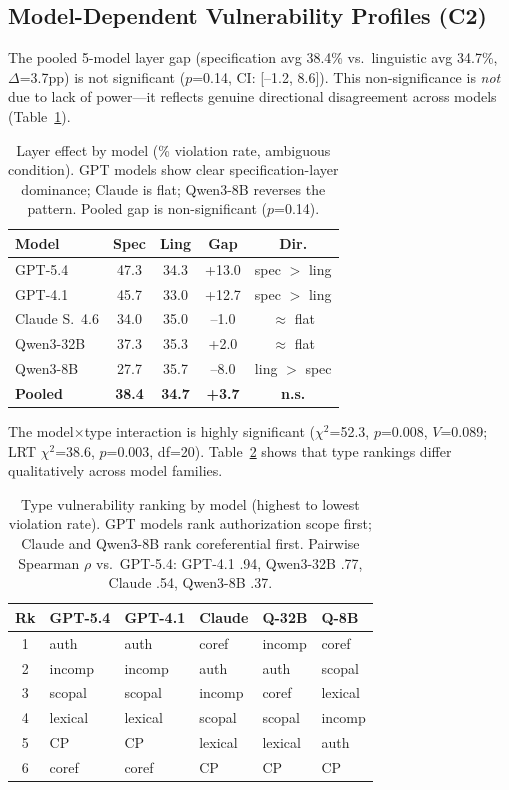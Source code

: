 \documentclass[11pt]{article}
\begin{document}
\subsection{Model-Dependent Vulnerability Profiles (C2)}

The pooled 5-model layer gap (specification avg 38.4\% vs.\ linguistic avg 34.7\%, $\Delta$=3.7pp) is not significant ($p$=0.14, CI: [--1.2, 8.6]). This non-significance is \emph{not} due to lack of power---it reflects genuine directional disagreement across models (Table~\ref{tab:layer}).

\begin{table}[t]
\centering
\small
\begin{tabular}{lcccc}
\toprule
\textbf{Model} & \textbf{Spec} & \textbf{Ling} & \textbf{Gap} & \textbf{Dir.} \\
\midrule
GPT-5.4 & 47.3 & 34.3 & +13.0 & spec $>$ ling \\
GPT-4.1 & 45.7 & 33.0 & +12.7 & spec $>$ ling \\
Claude S.\ 4.6 & 34.0 & 35.0 & --1.0 & $\approx$ flat \\
Qwen3-32B & 37.3 & 35.3 & +2.0 & $\approx$ flat \\
Qwen3-8B & 27.7 & 35.7 & --8.0 & ling $>$ spec \\
\midrule
\textbf{Pooled} & \textbf{38.4} & \textbf{34.7} & \textbf{+3.7} & \textbf{n.s.} \\
\bottomrule
\end{tabular}
\caption{Layer effect by model (\% violation rate, ambiguous condition). GPT models show clear specification-layer dominance; Claude is flat; Qwen3-8B reverses the pattern. Pooled gap is non-significant ($p$=0.14).}
\label{tab:layer}
\end{table}

The model$\times$type interaction is highly significant ($\chi^2$=52.3, $p$=0.008, $V$=0.089; LRT $\chi^2$=38.6, $p$=0.003, df=20). Table~\ref{tab:rank} shows that type rankings differ qualitatively across model families.

\begin{table}[t]
\centering
\small
\setlength{\tabcolsep}{3pt}
\begin{tabular}{clllll}
\toprule
\textbf{Rk} & \textbf{GPT-5.4} & \textbf{GPT-4.1} & \textbf{Claude} & \textbf{Q-32B} & \textbf{Q-8B} \\
\midrule
1 & auth & auth & coref & incomp & coref \\
2 & incomp & incomp & auth & auth & scopal \\
3 & scopal & scopal & incomp & coref & lexical \\
4 & lexical & lexical & scopal & scopal & incomp \\
5 & CP & CP & lexical & lexical & auth \\
6 & coref & coref & CP & CP & CP \\
\bottomrule
\end{tabular}
\caption{Type vulnerability ranking by model (highest to lowest violation rate). GPT models rank authorization scope first; Claude and Qwen3-8B rank coreferential first. Pairwise Spearman $\rho$ vs.\ GPT-5.4: GPT-4.1 .94, Qwen3-32B .77, Claude .54, Qwen3-8B .37.}
\label{tab:rank}
\end{table}
\end{document}
